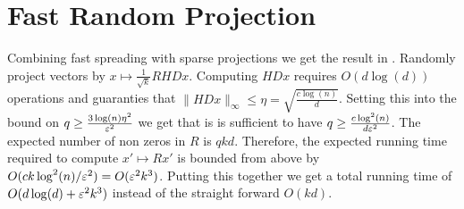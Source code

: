 \documentclass{article}
\begin{document}
\section{Fast Random Projection}

Combining fast spreading with sparse projections  we get the result in \cite{AilonCh06}.
Randomly project vectors by $x \mapsto \frac{1}{\sqrt{k}}RHDx$.
Computing $HDx$ requires $O(d\log(d))$ operations and guaranties that $\|HDx\|_\infty \le \eta = \sqrt{\frac{c\log(n)}{d}}$.
Setting this into the bound on $q \ge \frac{3\log(n)\eta^2}{\varepsilon^2}$ we get that is is sufficient to 
have $q \ge \frac{c\log^2(n)}{d\varepsilon^2}$. The expected number of non zeros in $R$ is $qkd$.
Therefore, the expected running time required to compute $x' \mapsto Rx'$ is bounded from above by
$O(ck\log^2(n)/\varepsilon^2) = O(\varepsilon^2 k^3)$.
Putting this together we get a total running time of $O(d\log(d) + \varepsilon^2 k^3)$ instead of the straight forward $O(kd)$. 



\end{document}
